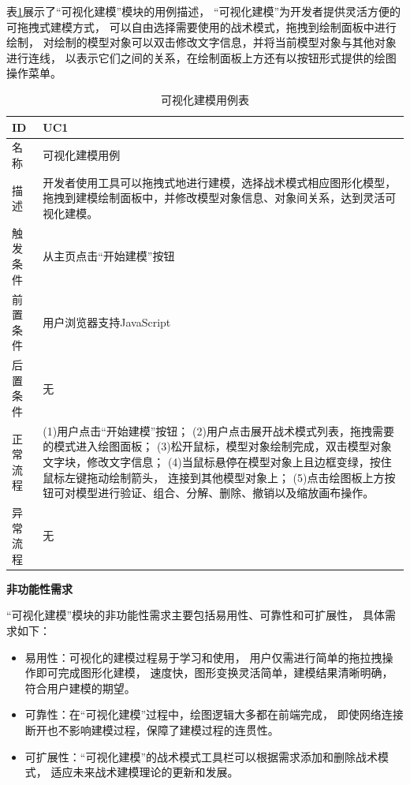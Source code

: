 表\ref{usecase1}展示了“可视化建模”模块的用例描述，
“可视化建模”为开发者提供灵活方便的可拖拽式建模方式，
可以自由选择需要使用的战术模式，拖拽到绘制面板中进行绘制，
对绘制的模型对象可以双击修改文字信息，并将当前模型对象与其他对象进行连线，
以表示它们之间的关系，在绘制面板上方还有以按钮形式提供的绘图操作菜单。

{\footnotesize
\begin{longtable}[h]{m{80pt}|m{305pt}}
    \caption[可视化建模用例表]{可视化建模用例表} \label{usecase1} \\
        \hline  
        ID&UC1\\
        \hline
        名称&可视化建模用例\\
        \hline
        描述&开发者使用工具可以拖拽式地进行建模，选择战术模式相应图形化模型，
        拖拽到建模绘制面板中，并修改模型对象信息、对象间关系，达到灵活可视化建模。\\
        \hline
        触发条件&从主页点击“开始建模”按钮\\
        \hline
        前置条件&用户浏览器支持JavaScript\\
        \hline
        后置条件&无\\
        \hline
        正常流程& (1)用户点击“开始建模”按钮；
        \newline (2)用户点击展开战术模式列表，拖拽需要的模式进入绘图面板；
        \newline (3)松开鼠标，模型对象绘制完成，双击模型对象文字块，修改文字信息；
        \newline (4)当鼠标悬停在模型对象上且边框变绿，按住鼠标左键拖动绘制箭头，
                    连接到其他模型对象上；
        \newline (5)点击绘图板上方按钮可对模型进行验证、组合、分解、删除、撤销以及缩放画布操作。\\
        \hline
        异常流程&无\\
        \hline
    \end{longtable} 
}

\textbf{非功能性需求}

“可视化建模”模块的非功能性需求主要包括易用性、可靠性和可扩展性，
具体需求如下：

\begin{itemize}
    \item 易用性：可视化的建模过程易于学习和使用，
    用户仅需进行简单的拖拉拽操作即可完成图形化建模，
    速度快，图形变换灵活简单，建模结果清晰明确，符合用户建模的期望。

    \item 可靠性：在“可视化建模”过程中，绘图逻辑大多都在前端完成，
     即使网络连接断开也不影响建模过程，保障了建模过程的连贯性。
   
     \item 可扩展性：“可视化建模”的战术模式工具栏可以根据需求添加和删除战术模式，
     适应未来战术建模理论的更新和发展。
\end{itemize}

